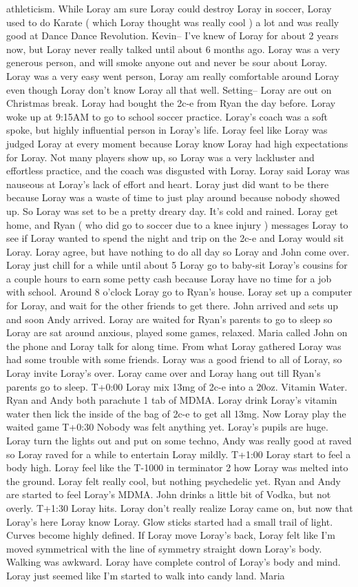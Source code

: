 \documentclass[12pt]{book}
\begin{document}
athleticism. While Loray am sure Loray could destroy Loray in soccer, Loray used to do Karate ( which Loray thought was really cool ) a lot and was really good at Dance Dance Revolution. Kevin-- I've knew of Loray for about 2 years now, but Loray never really talked until about 6 months ago. Loray was a very generous person, and will smoke anyone out and never be sour about Loray. Loray was a very easy went person, Loray am really comfortable around Loray even though Loray don't know Loray all that well. Setting-- Loray are out on Christmas break. Loray had bought the 2c-e from Ryan the day before. Loray woke up at 9:15AM to go to school soccer practice. Loray's coach was a soft spoke, but highly influential person in Loray's life. Loray feel like Loray was judged Loray at every moment because Loray know Loray had high expectations for Loray. Not many players show up, so Loray was a very lackluster and effortless practice, and the coach was disgusted with Loray. Loray said Loray was nauseous at Loray's lack of effort and heart. Loray just did want to be there because Loray was a waste of time to just play around because nobody showed up. So Loray was set to be a pretty dreary day. It's cold and rained. Loray get home, and Ryan ( who did go to soccer due to a knee injury ) messages Loray to see if Loray wanted to spend the night and trip on the 2c-e and Loray would sit Loray. Loray agree, but have nothing to do all day so Loray and John come over. Loray just chill for a while until about 5 Loray go to baby-sit Loray's cousins for a couple hours to earn some petty cash because Loray have no time for a job with school. Around 8 o'clock Loray go to Ryan's house. Loray set up a computer for Loray, and wait for the other friends to get there. John arrived and sets up and soon Andy arrived. Loray are waited for Ryan's parents to go to sleep so Loray are sat around anxious, played some games, relaxed. Maria called John on the phone and Loray talk for along time. From what Loray gathered Loray was had some trouble with some friends. Loray was a good friend to all of Loray, so Loray invite Loray's over. Loray came over and Loray hang out till Ryan's parents go to sleep. T+0:00 Loray mix 13mg of 2c-e into a 20oz. Vitamin Water. Ryan and Andy both parachute 1 tab of MDMA. Loray drink Loray's vitamin water then lick the inside of the bag of 2c-e to get all 13mg. Now Loray play the waited game T+0:30 Nobody was felt anything yet. Loray's pupils are huge. Loray turn the lights out and put on some techno, Andy was really good at raved so Loray raved for a while to entertain Loray mildly. T+1:00 Loray start to feel a body high. Loray feel like the T-1000 in terminator 2 how Loray was melted into the ground. Loray felt really cool, but nothing psychedelic yet. Ryan and Andy are started to feel Loray's MDMA. John drinks a little bit of Vodka, but not overly. T+1:30 Loray hits. Loray don't really realize Loray came on, but now that Loray's here Loray know Loray. Glow sticks started had a small trail of light. Curves become highly defined. If Loray move Loray's back, Loray felt like I'm moved symmetrical with the line of symmetry straight down Loray's body. Walking was awkward. Loray have complete control of Loray's body and mind. Loray just seemed like I'm started to walk into candy land. Maria 
\end{document}
